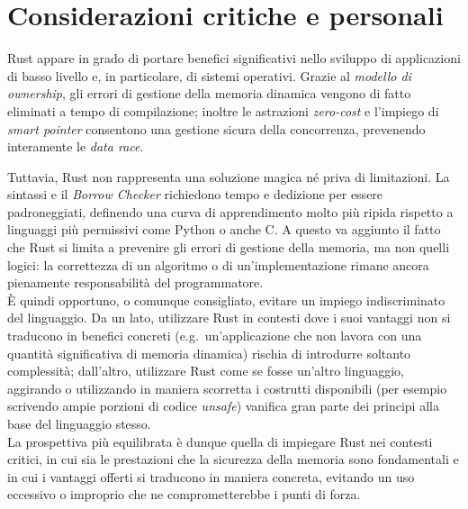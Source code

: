 \section{Considerazioni critiche e personali}\label{sec:critique}
Rust appare in grado di portare benefici significativi nello sviluppo di applicazioni di basso livello e, in particolare, di sistemi operativi.
Grazie al \textit{modello di ownership}, gli errori di gestione della memoria dinamica vengono di fatto eliminati a tempo di compilazione; inoltre 
le astrazioni \textit{zero-cost} e l'impiego di \textit{smart pointer} consentono una gestione sicura della concorrenza, prevenendo interamente le \textit{data race}.

Tuttavia, Rust non rappresenta una soluzione magica né priva di limitazioni. La sintassi e il \textit{Borrow Checker} richiedono tempo e dedizione per essere
padroneggiati, definendo una curva di apprendimento molto più ripida rispetto a linguaggi più permissivi come Python o anche C. A questo va aggiunto il fatto 
che Rust si limita a prevenire gli errori di gestione della memoria, ma non quelli logici: la correttezza di un algoritmo o di un'implementazione 
rimane ancora pienamente responsabilità del programmatore. \hfill 
\vspace{10pt}\\
\noindent È quindi opportuno, o comunque consigliato, evitare un impiego indiscriminato del linguaggio. Da un lato, utilizzare Rust in contesti 
dove i suoi vantaggi non si traducono in benefici concreti 
(e.g.\  un'applicazione che non lavora con una quantità significativa di memoria dinamica)
rischia di introdurre soltanto complessità;
dall'altro, utilizzare Rust come se fosse un'altro linguaggio, aggirando o utilizzando in maniera scorretta i costrutti 
disponibili (per esempio scrivendo ampie porzioni di codice \textit{unsafe}) vanifica gran parte dei 
principi alla base del linguaggio stesso. \hfill 
\vspace{10pt}\\
\noindent La prospettiva più equilibrata è dunque quella di impiegare Rust nei contesti critici, in cui sia le prestazioni che la sicurezza della memoria sono 
fondamentali e in cui i vantaggi offerti si traducono in maniera concreta, evitando un uso eccessivo o improprio che ne comprometterebbe i punti di forza.